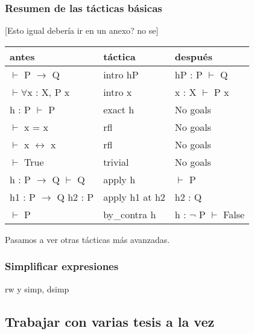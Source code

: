 \documentclass{article}
\begin{document}
\subsubsection{Resumen de las tácticas básicas}


[Esto igual debería ir en un anexo? no se]

\renewcommand{\arraystretch}{2}

\begin{center}
\begin{tabular}{|  m{8em}  |m{8em} |m{8em}  |} 
  \hline
  \textbf{antes} & \textbf{táctica} & \textbf{después} \\
  \hline
  $\vdash$ P $\rightarrow$ Q & intro hP & \parbox{8em}{hP : P \\ $\vdash$ Q} \\ 
  \hline
  $\vdash \forall$x : X, P x & intro x &  \parbox{8em}{x : X \\ $\vdash$ P x} \\ 
  \hline
  \parbox{8em}{h : P \\ $\vdash$ P}& exact h & No goals\\ 
  \hline
  $\vdash$ x = x & rfl & No goals\\ 
  \hline
  $\vdash$ x $\leftrightarrow$ x & rfl & No goals\\ 
  \hline
  $\vdash$ True & trivial & No goals \\ 
  \hline
  \parbox{8em}{h : P $\rightarrow$ Q \\ $\vdash$ Q} & apply h & $\vdash$ P\\ 
  \hline
  \parbox{8em}{h1 : P $\rightarrow$ Q \\ h2 : P} & apply h1 at h2 & h2 : Q\\ 
  \hline
  $\vdash$ P & by\_contra h & \parbox{8em}{h : $\neg$ P \\ $\vdash$ False} \\\hline
\end{tabular}
\end{center}

Pasamos a ver otras tácticas más avanzadas.

\subsubsection{Simplificar expresiones}

rw y simp, dsimp

\subsection{Trabajar con varias tesis a la vez}
\end{document}
